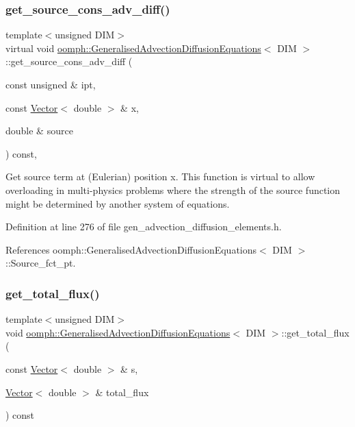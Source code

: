 \subsubsection{\texorpdfstring{get\+\_\+source\+\_\+cons\+\_\+adv\+\_\+diff()}{get\_source\_cons\_adv\_diff()}}
{\footnotesize\ttfamily template$<$unsigned D\+IM$>$ \\
virtual void \hyperlink{classoomph_1_1GeneralisedAdvectionDiffusionEquations}{oomph\+::\+Generalised\+Advection\+Diffusion\+Equations}$<$ D\+IM $>$\+::get\+\_\+source\+\_\+cons\+\_\+adv\+\_\+diff (\begin{DoxyParamCaption}\item[{const unsigned \&}]{ipt,  }\item[{const \hyperlink{classoomph_1_1Vector}{Vector}$<$ double $>$ \&}]{x,  }\item[{double \&}]{source }\end{DoxyParamCaption}) const\hspace{0.3cm}{\ttfamily [inline]}, {\ttfamily [virtual]}}



Get source term at (Eulerian) position x. This function is virtual to allow overloading in multi-\/physics problems where the strength of the source function might be determined by another system of equations. 



Definition at line 276 of file gen\+\_\+advection\+\_\+diffusion\+\_\+elements.\+h.



References oomph\+::\+Generalised\+Advection\+Diffusion\+Equations$<$ D\+I\+M $>$\+::\+Source\+\_\+fct\+\_\+pt.

\mbox{\label{classoomph_1_1GeneralisedAdvectionDiffusionEquations_a79bce0d40bdc46e998729332ceefb889}} 
\subsubsection{\texorpdfstring{get\+\_\+total\+\_\+flux()}{get\_total\_flux()}}
{\footnotesize\ttfamily template$<$unsigned D\+IM$>$ \\
void \hyperlink{classoomph_1_1GeneralisedAdvectionDiffusionEquations}{oomph\+::\+Generalised\+Advection\+Diffusion\+Equations}$<$ D\+IM $>$\+::get\+\_\+total\+\_\+flux (\begin{DoxyParamCaption}\item[{const \hyperlink{classoomph_1_1Vector}{Vector}$<$ double $>$ \&}]{s,  }\item[{\hyperlink{classoomph_1_1Vector}{Vector}$<$ double $>$ \&}]{total\+\_\+flux }\end{DoxyParamCaption}) const\hspace{0.3cm}{\ttfamily [inline]}}



